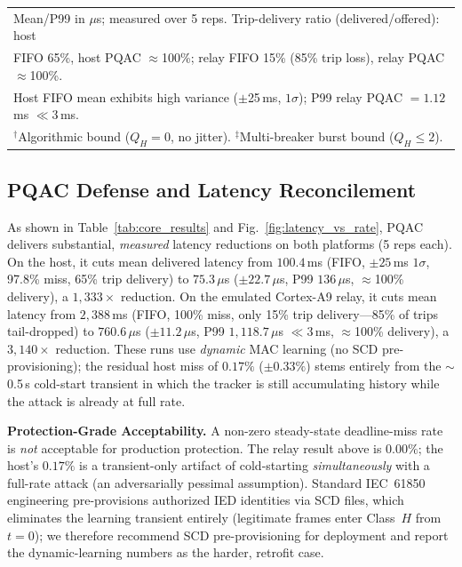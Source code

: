 \documentclass[journal]{IEEEtran}
\begin{document}
\begin{table}[t]
{\begin{tabular}{llcccc}
\bottomrule
\multicolumn{6}{l}{\scriptsize Mean/P99 in $\mu$s; measured over 5 reps. Trip-delivery ratio (delivered/offered): host} \\
\multicolumn{6}{l}{\scriptsize FIFO 65\%, host PQAC $\approx$100\%; relay FIFO 15\% (85\% trip loss), relay PQAC $\approx$100\%.} \\
\multicolumn{6}{l}{\scriptsize Host FIFO mean exhibits high variance ($\pm$25\,ms, $1\sigma$); P99 relay PQAC $=1.12$\,ms $\ll 3$\,ms.} \\
\multicolumn{6}{l}{\scriptsize $^\dagger$Algorithmic bound ($Q_H{=}0$, no jitter). $^\ddagger$Multi-breaker burst bound ($Q_H{\le}2$).} \\
\end{tabular}%
}
\end{table}

\subsection{PQAC Defense and Latency Reconcilement}
As shown in Table~\ref{tab:core_results} and Fig.~\ref{fig:latency_vs_rate}, PQAC delivers substantial, \emph{measured} latency reductions on both platforms (5 reps each). On the host, it cuts mean delivered latency from $100.4$\,ms (FIFO, $\pm 25$\,ms $1\sigma$, 97.8\% miss, 65\% trip delivery) to $75.3$\,$\mu$s ($\pm 22.7\,\mu$s, P99 $136\,\mu$s, $\approx$100\% delivery), a $1{,}333\times$ reduction. On the emulated Cortex-A9 relay, it cuts mean latency from $2{,}388$\,ms (FIFO, 100\% miss, only 15\% trip delivery---85\% of trips tail-dropped) to $760.6\,\mu$s ($\pm 11.2\,\mu$s, P99 $1{,}118.7\,\mu$s $\ll 3$\,ms, $\approx$100\% delivery), a $3{,}140\times$ reduction. These runs use \emph{dynamic} MAC learning (no SCD pre-provisioning); the residual host miss of $0.17\%$ ($\pm 0.33\%$) stems entirely from the $\sim$0.5\,s cold-start transient in which the tracker is still accumulating history while the attack is already at full rate.

\textbf{Protection-Grade Acceptability.} A non-zero steady-state deadline-miss rate is \emph{not} acceptable for production protection. The relay result above is $0.00\%$; the host's $0.17\%$ is a transient-only artifact of cold-starting \emph{simultaneously} with a full-rate attack (an adversarially pessimal assumption). Standard IEC~61850 engineering pre-provisions authorized IED identities via SCD files, which eliminates the learning transient entirely (legitimate frames enter Class~$H$ from $t=0$); we therefore recommend SCD pre-provisioning for deployment and report the dynamic-learning numbers as the harder, retrofit case.
\end{document}
